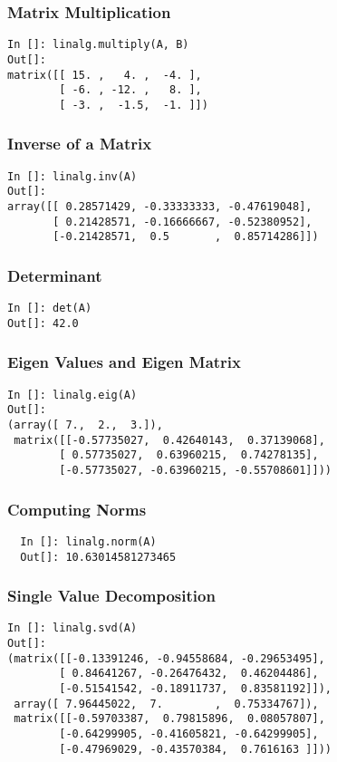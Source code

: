 \documentclass[14pt,compress]{beamer}
\begin{document}
\begin{frame}[fragile]
\frametitle{Matrix Multiplication}
\begin{lstlisting}
In []: linalg.multiply(A, B)
Out[]: 
matrix([[ 15. ,   4. ,  -4. ],
        [ -6. , -12. ,   8. ],
        [ -3. ,  -1.5,  -1. ]])
\end{lstlisting}
\end{frame}

\begin{frame}[fragile]
\frametitle{Inverse of a Matrix}
\begin{small}
\begin{lstlisting}
In []: linalg.inv(A)
Out[]: 
array([[ 0.28571429, -0.33333333, -0.47619048],
       [ 0.21428571, -0.16666667, -0.52380952],
       [-0.21428571,  0.5       ,  0.85714286]])
\end{lstlisting}
\end{small}
\end{frame}

\begin{frame}[fragile]
\frametitle{Determinant}
\begin{lstlisting}
In []: det(A)
Out[]: 42.0
\end{lstlisting}
\end{frame}

\begin{frame}[fragile]
\frametitle{Eigen Values and Eigen Matrix}
\begin{small}
\begin{lstlisting}
In []: linalg.eig(A)
Out[]: 
(array([ 7.,  2.,  3.]),
 matrix([[-0.57735027,  0.42640143,  0.37139068],
        [ 0.57735027,  0.63960215,  0.74278135],
        [-0.57735027, -0.63960215, -0.55708601]]))
\end{lstlisting}
\end{small}
\end{frame}

\begin{frame}[fragile]
\frametitle{Computing Norms}
\begin{lstlisting}
  In []: linalg.norm(A)
  Out[]: 10.63014581273465
\end{lstlisting}
\end{frame}

\begin{frame}[fragile]
  \frametitle{Single Value Decomposition}
  \begin{small}
  \begin{lstlisting}
In []: linalg.svd(A)
Out[]: 
(matrix([[-0.13391246, -0.94558684, -0.29653495],
        [ 0.84641267, -0.26476432,  0.46204486],
        [-0.51541542, -0.18911737,  0.83581192]]),
 array([ 7.96445022,  7.        ,  0.75334767]),
 matrix([[-0.59703387,  0.79815896,  0.08057807],
        [-0.64299905, -0.41605821, -0.64299905],
        [-0.47969029, -0.43570384,  0.7616163 ]]))
  \end{lstlisting}
  \end{small}
\end{frame}
\end{document}
